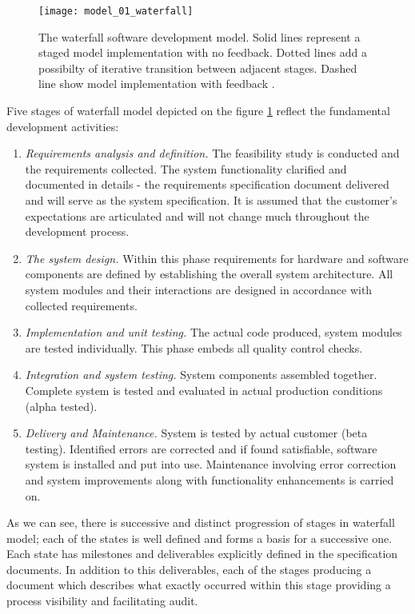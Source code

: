 \begin{figure}[tbp]
   \centering
   \texttt{[image: model\_01\_waterfall]}
   \caption{The waterfall software development model. Solid lines represent a staged 
      model implementation with no feedback. Dotted lines add a possibilty of 
      iterative transition between adjacent stages. Dashed line show model 
      implementation with feedback \cite{citeulike:9982731}. }
   \label{fig:model_waterfall}
\end{figure}

Five stages of waterfall model depicted on the figure \ref{fig:model_waterfall} 
reflect the fundamental development activities:
\begin{enumerate}
 \item \textit{Requirements analysis and definition.} 
The feasibility study is conducted and the requirements collected. 
The system functionality clarified and documented in details - the requirements 
specification document delivered  and will serve as the system specification. 
It is assumed that the customer's expectations are articulated and will not 
change much throughout the development process.
 \item \textit{The system design.} 
Within this phase requirements for hardware and software components are defined 
by establishing the overall system architecture. All system modules and their 
interactions are designed in accordance with collected requirements.
 \item \textit{Implementation and unit testing.} 
The actual code produced, system modules are tested individually. 
This phase embeds all quality control checks.
 \item \textit{Integration and system testing.} 
System components assembled together. Complete system is tested and evaluated in 
actual production conditions (alpha tested).
 \item \textit{Delivery and Maintenance.} 
System is tested by actual customer (beta testing). Identified errors are corrected 
and if found satisfiable, software system is installed and put into use. 
Maintenance involving error correction and system improvements along with functionality 
enhancements is carried on.
\end{enumerate}

As we can see, there is successive and distinct progression of stages in waterfall model;
each of the states is well defined and forms a basis for a successive one. 
Each state has milestones and deliverables explicitly defined in the specification documents.
In addition to this deliverables, each of the stages producing a document 
which describes what exactly occurred within this stage providing a process visibility 
and facilitating audit. 

